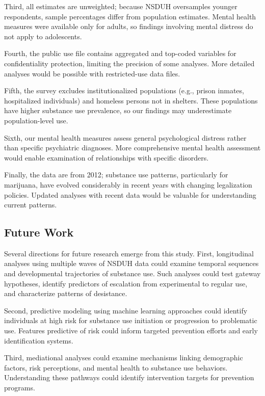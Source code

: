 \documentclass[conference]{IEEEtran}
\begin{document}
Third, all estimates are unweighted; because NSDUH oversamples younger respondents, sample percentages differ from population estimates. Mental health measures were available only for adults, so findings involving mental distress do not apply to adolescents.

Fourth, the public use file contains aggregated and top-coded variables for confidentiality protection, limiting the precision of some analyses. More detailed analyses would be possible with restricted-use data files.

Fifth, the survey excludes institutionalized populations (e.g., prison inmates, hospitalized individuals) and homeless persons not in shelters. These populations have higher substance use prevalence, so our findings may underestimate population-level use.

Sixth, our mental health measures assess general psychological distress rather than specific psychiatric diagnoses. More comprehensive mental health assessment would enable examination of relationships with specific disorders.

Finally, the data are from 2012; substance use patterns, particularly for marijuana, have evolved considerably in recent years with changing legalization policies. Updated analyses with recent data would be valuable for understanding current patterns.

\subsection{Future Work}

Several directions for future research emerge from this study. First, longitudinal analyses using multiple waves of NSDUH data could examine temporal sequences and developmental trajectories of substance use. Such analyses could test gateway hypotheses, identify predictors of escalation from experimental to regular use, and characterize patterns of desistance.

Second, predictive modeling using machine learning approaches could identify individuals at high risk for substance use initiation or progression to problematic use. Features predictive of risk could inform targeted prevention efforts and early identification systems.

Third, mediational analyses could examine mechanisms linking demographic factors, risk perceptions, and mental health to substance use behaviors. Understanding these pathways could identify intervention targets for prevention programs.
\end{document}
